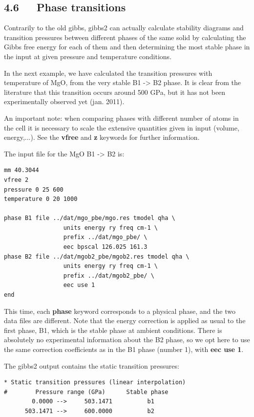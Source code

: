 \documentclass[a4paper]{article}
\begin{document}
\subsection{4.6~~~Phase transitions%
  \label{phase-transitions}%
}

Contrarily to the old gibbs, gibbs2 can actually calculate stability
diagrams and transition pressures between different phases of the same
solid by calculating the Gibbs free energy for each of them and then
determining the most stable phase in the input at given pressure and
temperature conditions.

In the next example, we have calculated the transition pressures with
temperature of MgO, from the very stable B1 -> B2 phase. It is clear
from the literature that this transition occurs around 500 GPa, but
it has not been experimentally observed yet (jan. 2011).

An important note: when comparing phases with different number of
atoms in the cell it is necessary to scale the extensive quantities
given in input (volume, energy,...). See the \textbf{vfree} and \textbf{z}
keywords for further information.

The input file for the MgO B1 -> B2 is:
%
\asciilist
\begin{lstlisting}
mm 40.3044
vfree 2
pressure 0 25 600
temperature 0 20 1000

phase B1 file ../dat/mgo_pbe/mgo.res tmodel qha \
                 units energy ry freq cm-1 \
                 prefix ../dat/mgo_pbe/ \
                 eec bpscal 126.025 161.3
phase B2 file ../dat/mgob2_pbe/mgob2.res tmodel qha \
                 units energy ry freq cm-1 \
                 prefix ../dat/mgob2_pbe/ \
                 eec use 1
end
\end{lstlisting}

This time, each \textbf{phase} keyword corresponds to a physical phase, and
the two data files are different. Note that the energy correction is
applied as usual to the first phase, B1, which is the stable phase at
ambient conditions. There is absolutely no experimental information
about the B2 phase, so we opt here to use the same correction
coefficients as in the B1 phase (number 1), with \textbf{eec use 1}.

The gibbs2 output contains the static transition pressures:
%
\asciilist
\begin{lstlisting}
* Static transition pressures (linear interpolation)
#        Pressure range (GPa)      Stable phase
        0.0000 -->     503.1471          b1
      503.1471 -->     600.0000          b2
\end{lstlisting}
\end{document}
